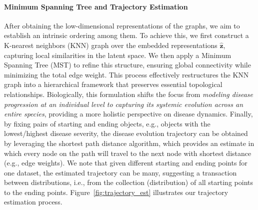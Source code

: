 \documentclass{article} %
\begin{document}
\paragraph{Minimum Spanning Tree and Trajectory Estimation}
After obtaining the low-dimensional representations of the graphs, we aim to establish an intrinsic ordering among them. To achieve this, we first construct a K-nearest neighbors (KNN) graph over the embedded representations $\widehat{\mathbf z}$, capturing local similarities in the latent space. We then apply a Minimum Spanning Tree (MST) to refine this structure, ensuring global connectivity while minimizing the total edge weight. This process effectively restructures the KNN graph into a hierarchical framework that preserves essential topological relationships. Biologically, this formulation shifts the focus from \textit{modeling disease progression at an individual level to capturing its systemic evolution across an entire species}, providing a more holistic perspective on disease dynamics. Finally, by fixing pairs of starting and ending objects, e.g., objects with the lowest/highest disease severity, the disease evolution trajectory can be obtained by leveraging the shortest path distance algorithm, which provides an estimate in which every node on the path will travel to the next node with shortest distance (e.g., edge weights). We note that given different starting and ending points for one dataset, the estimated trajectory can be many, suggesting a transaction between distributions, i.e., from the collection (distribution) of all starting points to the ending points. Figure~\ref{fig:trajectory_est} illustrates our trajectory estimation process.
\end{document}
